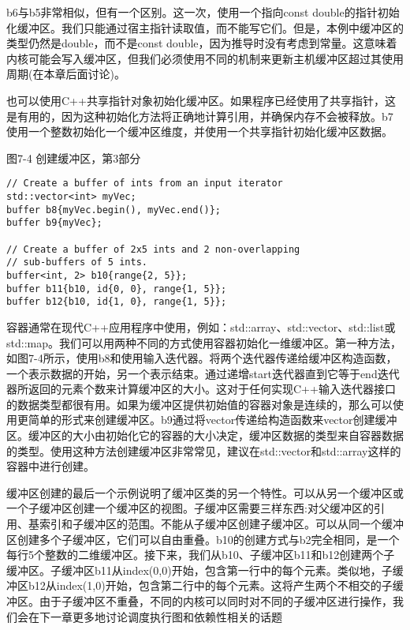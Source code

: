b6与b5非常相似，但有一个区别。这一次，使用一个指向const double的指针初始化缓冲区。我们只能通过宿主指针读取值，而不能写它们。但是，本例中缓冲区的类型仍然是double，而不是const double，因为推导时没有考虑到常量。这意味着内核可能会写入缓冲区，但我们必须使用不同的机制来更新主机缓冲区超过其使用周期(在本章后面讨论)。\par

也可以使用C++共享指针对象初始化缓冲区。如果程序已经使用了共享指针，这是有用的，因为这种初始化方法将正确地计算引用，并确保内存不会被释放。b7使用一个整数初始化一个缓冲区维度，并使用一个共享指针初始化缓冲区数据。\par

\hspace*{\fill} \par %
图7-4 创建缓冲区，第3部分
\begin{lstlisting}[caption={}]
// Create a buffer of ints from an input iterator
std::vector<int> myVec;
buffer b8{myVec.begin(), myVec.end()};
buffer b9{myVec};

// Create a buffer of 2x5 ints and 2 non-overlapping 
// sub-buffers of 5 ints.
buffer<int, 2> b10{range{2, 5}};
buffer b11{b10, id{0, 0}, range{1, 5}};
buffer b12{b10, id{1, 0}, range{1, 5}};
\end{lstlisting}

容器通常在现代C++应用程序中使用，例如：std::array、std::vector、std::list或std::map。我们可以用两种不同的方式使用容器初始化一维缓冲区。第一种方法，如图7-4所示，使用b8和使用输入迭代器。将两个迭代器传递给缓冲区构造函数，一个表示数据的开始，另一个表示结束。通过递增start迭代器直到它等于end迭代器所返回的元素个数来计算缓冲区的大小。这对于任何实现C++输入迭代器接口的数据类型都很有用。如果为缓冲区提供初始值的容器对象是连续的，那么可以使用更简单的形式来创建缓冲区。b9通过将vector传递给构造函数来vector创建缓冲区。缓冲区的大小由初始化它的容器的大小决定，缓冲区数据的类型来自容器数据的类型。使用这种方法创建缓冲区非常常见，建议在std::vector和std::array这样的容器中进行创建。\par

缓冲区创建的最后一个示例说明了缓冲区类的另一个特性。可以从另一个缓冲区或一个子缓冲区创建一个缓冲区的视图。子缓冲区需要三样东西:对父缓冲区的引用、基索引和子缓冲区的范围。不能从子缓冲区创建子缓冲区。可以从同一个缓冲区创建多个子缓冲区，它们可以自由重叠。b10的创建方式与b2完全相同，是一个每行5个整数的二维缓冲区。接下来，我们从b10、子缓冲区b11和b12创建两个子缓冲区。子缓冲区b11从index(0,0)开始，包含第一行中的每个元素。类似地，子缓冲区b12从index(1,0)开始，包含第二行中的每个元素。这将产生两个不相交的子缓冲区。由于子缓冲区不重叠，不同的内核可以同时对不同的子缓冲区进行操作，我们会在下一章更多地讨论调度执行图和依赖性相关的话题\par

